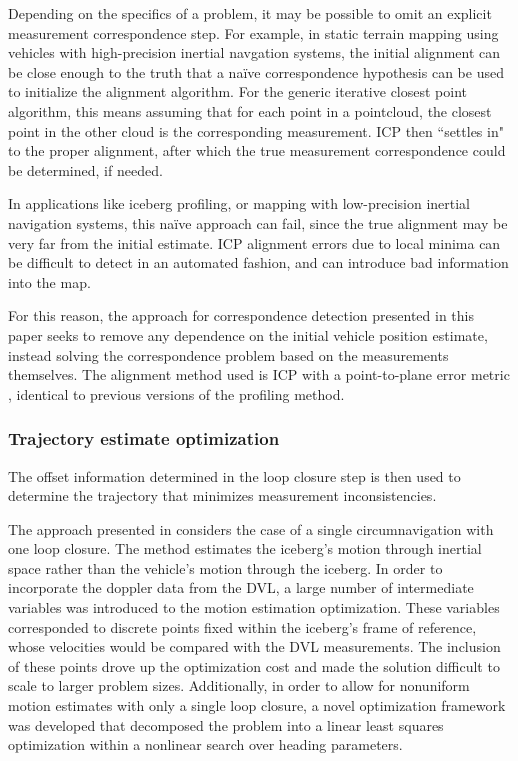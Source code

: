 Depending on the specifics of a problem, it may be possible to omit an explicit measurement correspondence step. For example, in static terrain mapping using vehicles with high-precision inertial navgation systems, the initial alignment can be close enough to the truth that a na\"ive correspondence hypothesis can be used to initialize the alignment algorithm. For the generic iterative closest point algorithm, this means assuming that for each point in a pointcloud, the closest point in the other cloud is the corresponding measurement. ICP then ``settles in" to the proper alignment, after which the true measurement correspondence could be determined, if needed. 

In applications like iceberg profiling, or mapping with low-precision inertial navigation systems, this na\"ive approach can fail, since the true alignment may be very far from the initial estimate. ICP alignment errors due to local minima can be difficult to detect in an automated fashion, and can introduce bad information into the map. 

For this reason, the approach for correspondence detection presented in this paper seeks to remove any dependence on the initial vehicle position estimate, instead solving the correspondence problem based on the measurements themselves. The alignment method used is ICP with a point-to-plane error metric \cite{?}, identical to previous versions of the profiling method. 

\subsubsection{Trajectory estimate optimization}

The offset information determined in the loop closure step is then used to determine the trajectory that minimizes measurement inconsistencies. 

The approach presented in \cite{Kimball2011b} considers the case of a single circumnavigation with one loop closure.  The method estimates the iceberg's motion through inertial space rather than the vehicle's motion through the iceberg. In order to incorporate the doppler data from the DVL, a large number of intermediate variables was introduced to the motion estimation optimization. These variables corresponded to discrete points fixed within the iceberg's frame of reference, whose velocities would be compared with the DVL measurements. The inclusion of these points drove up the optimization cost and made the solution difficult to scale to larger problem sizes. Additionally, in order to allow for nonuniform motion estimates with only a single loop closure, a novel optimization framework was developed that decomposed the problem into a linear least squares optimization within a nonlinear search over heading parameters.

